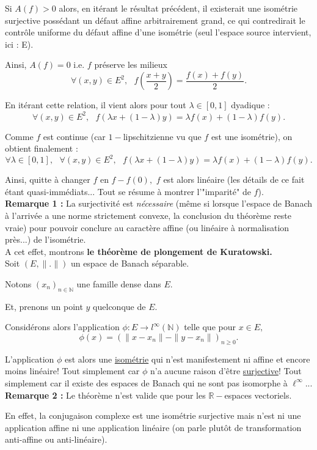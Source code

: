 Si $A(f)>0$ alors, en itérant le résultat précédent, il existerait une isométrie surjective possédant un défaut affine arbitrairement grand, ce qui contredirait le contrôle uniforme du défaut affine d'une isométrie (seul l'espace source intervient, ici : E).

Ainsi, $A(f)=0$ i.e. $f$ préserve les milieux $$\forall (x,y)\in E^{2},\mbox{ } f(\frac{x+y}{2})=\frac{f(x)+f(y)}{2}.$$

En itérant cette relation, il vient alors pour tout $\lambda\in[0,1]$ dyadique : $$\forall (x,y)\in E^{2},\mbox{ } f(\lambda x + (1-\lambda)y)=\lambda f(x)+(1-\lambda)f(y).$$

Comme $f$ est continue (car $1-$lipschitzienne vu que $f$ est une isométrie), on obtient finalement : $$\forall\lambda\in[0,1],\mbox{ }\forall (x,y)\in E^{2},\mbox{ } f(\lambda x + (1-\lambda)y)=\lambda f(x)+(1-\lambda)f(y).$$

Ainsi, quitte à changer $f$ en $f-f(0),$ $f$ est alors linéaire (les détails de ce fait étant quasi-immédiats... Tout se résume à montrer l'"imparité" de $f$).\\


\textbf{Remarque 1 :} La surjectivité est \emph{nécessaire} (même si lorsque l'espace de Banach à l'arrivée a une norme strictement convexe, la conclusion du théorème reste vraie) pour pouvoir conclure au caractère affine (ou linéaire à normalisation près...) de l'isométrie.\\

A cet effet, montrons \textbf{le théorème de plongement de Kuratowski.}\\

Soit $(E,\|.\|)$ un espace de Banach séparable.

Notons $(x_{n})_{n\in\mathbb{N}}$ une famille dense dans $E.$ 

Et, prenons un point $y$ quelconque de $E.$

Considérons alors l'application $\displaystyle \phi : E \rightarrow l^{\infty}(\mathbb{N})$ telle que pour $x\in E,$ $$\phi(x)=(\|x-x_{n}\|-\|y-x_{n}\|)_{n\geq 0}.$$

L'application $\phi$ est alors une \underline{isométrie} qui n'est manifestement ni affine et encore moins linéaire!
Tout simplement car $\phi$ n'a aucune raison d'être \underline{surjective}! 
Tout simplement car il existe des espaces de Banach qui ne sont pas isomorphe à $\ell^{\infty}$...\\

\textbf{Remarque 2 : } Le théorème n'est valide que pour les $\mathbb{R}-$espaces vectoriels. 

En effet, la conjugaison complexe est une isométrie surjective mais n'est ni une application affine ni une application linéaire (on parle plutôt de transformation anti-affine ou anti-linéaire).   
